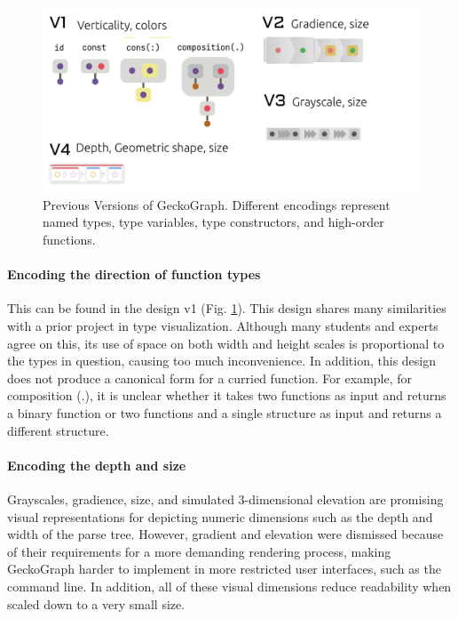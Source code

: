 \begin{figure}[hbt]
  \includegraphics[width=\linewidth]{figures/PreviousVersions}
  \caption[Previous Versions of GeckoGraph]{\label{fig:previous}Previous Versions of GeckoGraph. Different encodings represent named types, type variables, type constructors, and high-order functions.}
\end{figure}

 
\paragraph{\textbf{Encoding the direction of function types}}
This can be found in the design v1 (Fig. \ref{fig:previous}). This design shares many similarities with a prior project \cite{Jung2000-oc} in type visualization. Although many students and experts agree on this, its use of space on both width and height scales is proportional to the types in question, causing too much inconvenience. In addition, this design does not produce a canonical form for a curried function. For example, for composition (.), it is unclear whether it takes two functions as input and returns a binary function or two functions and a single structure as input and returns a different structure.

\paragraph{Encoding the depth and size} Grayscales, gradience, size, and simulated 3-dimensional elevation are promising visual representations for depicting numeric dimensions such as the depth and width of the parse tree. However, gradient and elevation were dismissed because of their requirements for a more demanding rendering process, making GeckoGraph harder to implement in more restricted user interfaces, such as the command line. In addition, all of these visual dimensions reduce readability when scaled down to a very small size.

